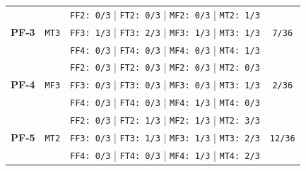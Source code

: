 \begin{table}[H]
\begin{center}
\begin{tabular}[c]{ |c|c|c|c|}
\multirow{3}{*}{\textbf{PF-3}} & \multirow{3}{*}{\texttt{MT3}}
&   \texttt{FF2: 0/3}  |  \texttt{FT2: 0/3}  |  \texttt{MF2: 0/3}  |  \texttt{MT2: 1/3} & \multirow{3}{*}{\texttt{7/36}} \\
& & \texttt{FF3: 1/3}  |  \texttt{FT3: 2/3}  |  \texttt{MF3: 1/3}  |  \texttt{MT3: 1/3} & \\
& & \texttt{FF4: 0/3}  |  \texttt{FT4: 0/3}  |  \texttt{MF4: 0/3}  |  \texttt{MT4: 1/3} & \\
\hline
\multirow{3}{*}{\textbf{PF-4}} & \multirow{3}{*}{\texttt{MF3}}
&   \texttt{FF2: 0/3}  |  \texttt{FT2: 0/3}  |  \texttt{MF2: 0/3}  |  \texttt{MT2: 0/3} & \multirow{3}{*}{\texttt{2/36}} \\
& & \texttt{FF3: 0/3}  |  \texttt{FT3: 0/3}  |  \texttt{MF3: 0/3}  |  \texttt{MT3: 1/3} & \\
& & \texttt{FF4: 0/3}  |  \texttt{FT4: 0/3}  |  \texttt{MF4: 1/3}  |  \texttt{MT4: 0/3} & \\
\hline
\multirow{3}{*}{\textbf{PF-5}} & \multirow{3}{*}{\texttt{MT2}}
&   \texttt{FF2: 0/3}  |  \texttt{FT2: 1/3}  |  \texttt{MF2: 1/3}  |  \texttt{MT2: 3/3} & \multirow{3}{*}{\texttt{12/36}} \\
& & \texttt{FF3: 0/3}  |  \texttt{FT3: 1/3}  |  \texttt{MF3: 1/3}  |  \texttt{MT3: 2/3} & \\
& & \texttt{FF4: 0/3}  |  \texttt{FT4: 0/3}  |  \texttt{MF4: 1/3}  |  \texttt{MT4: 2/3} & \\
\hline


\end{tabular}
\end{center}
\end{table}
